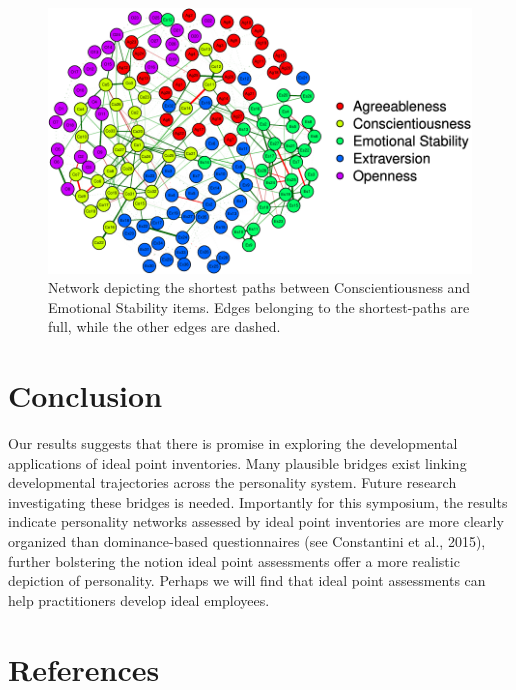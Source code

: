 \documentclass[man]{apa6}
\begin{document}
\begin{figure}
\centering
\includegraphics{Ideal_Point_Items_and_Network_Analysis_files/figure-latex/unnamed-chunk-8-1.pdf}
\caption{\label{fig:unnamed-chunk-8}Network depicting the shortest paths
between Conscientiousness and Emotional Stability items. Edges belonging
to the shortest-paths are full, while the other edges are dashed.}
\end{figure}

\section{Conclusion}\label{conclusion}

Our results suggests that there is promise in exploring the
developmental applications of ideal point inventories. Many plausible
bridges exist linking developmental trajectories across the personality
system. Future research investigating these bridges is needed.
Importantly for this symposium, the results indicate personality
networks assessed by ideal point inventories are more clearly organized
than dominance-based questionnaires (see Constantini et al., 2015),
further bolstering the notion ideal point assessments offer a more
realistic depiction of personality. Perhaps we will find that ideal
point assessments can help practitioners develop ideal employees.

\newpage

\section{References}\label{references}

\setlength{\parindent}{-0.5in} \setlength{\leftskip}{0.5in}
\end{document}
